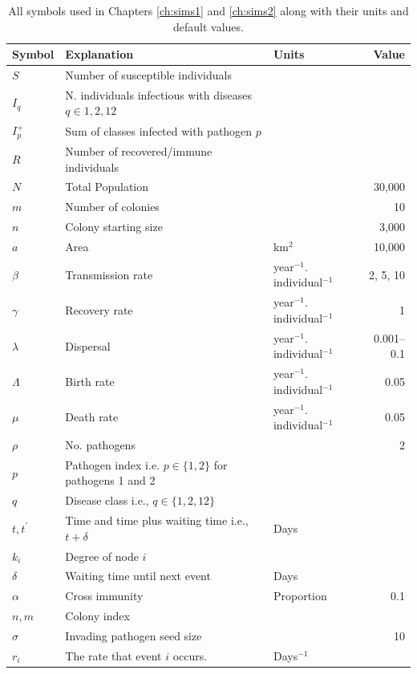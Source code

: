 

\begin{table}[b!]
\centering
\caption[All symbols used in Chapters \ref{ch:sims1} and \ref{ch:sims2}.]{All symbols used in Chapters \ref{ch:sims1} and \ref{ch:sims2} along with their units and default values.}

\begin{tabular}{@{}lp{6cm}p{2.9cm}r@{}}
\toprule
Symbol & Explanation & Units & Value\\
\midrule
$S$ & Number of susceptible individuals &&\\
$I_q$ & N. individuals infectious with diseases $q \in {1, 2, 12}$ &&\\
$I^+_p$ & Sum of classes infected with pathogen $p$ &\\
$R$ & Number of recovered/immune individuals &&\\
$N$ & Total Population && 30,000\\
$m$ & Number of colonies&& 10\\
$n$ & Colony starting size && 3,000\\
$a$ & Area & km$^2$& 10,000\\
$\beta$ & Transmission rate & year$^{-1}.$individual$^{-1}$ & 2, 5, 10\\
$\gamma$ & Recovery rate & year$^{-1}.$individual$^{-1}$ & 1\\
$\lambda$ & Dispersal & year$^{-1}.$individual$^{-1}$ & 0.001--0.1\\
$\Lambda$ & Birth rate & year$^{-1}.$individual$^{-1}$ & 0.05\\
$\mu$ & Death rate & year$^{-1}.$individual$^{-1}$ & 0.05\\
$\rho$ & No. pathogens && 2\\
$p$ &  Pathogen index i.e. $p\in\{1,2\}$ for pathogens 1 and 2 & &\\
$q$ & Disease class i.e., $q\in\{1,2,12\}$&\\
$t, t^\prime$ & Time and time plus waiting time i.e., $t+\delta$ & Days&\\
$k_i$ & Degree of node $i$ &&\\
$\delta$ & Waiting time until next event & Days&\\
$\alpha$ & Cross immunity & Proportion& 0.1\\
$n, m$ & Colony index &&\\
$\sigma$ & Invading pathogen seed size & & 10\\
$r_i$ & The rate that event $i$ occurs. & Days$^{-1}$&\\
\bottomrule
\end{tabular}


\end{table}
